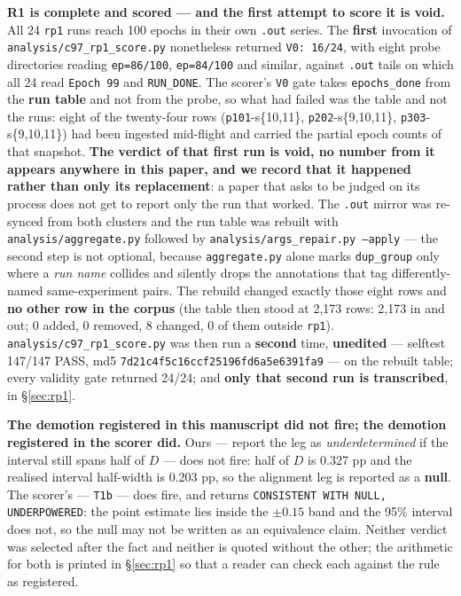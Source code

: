 \documentclass[10pt,letterpaper]{article}
\newcommand{\Dstat}{D}                         %
\newcommand{\arm}[1]{\texttt{#1}}
\begin{document}
\textbf{R1 is complete and scored --- and the first attempt to score it is void.} All 24
\arm{rp1} runs reach 100 epochs in their own \texttt{.out} series. The \textbf{first} invocation
of \texttt{analysis/c97\_rp1\_score.py} nonetheless returned \texttt{V0: 16/24}, with eight probe
directories reading \texttt{ep=86/100}, \texttt{ep=84/100} and similar, against \texttt{.out}
tails on which all 24 read \texttt{Epoch 99} and \texttt{RUN\_DONE}. The scorer's \texttt{V0}
gate takes \texttt{epochs\_done} from the \textbf{run table} and not from the probe, so what had
failed was the table and not the runs: eight of the twenty-four rows
(\arm{p101}-s\{10,11\}, \arm{p202}-s\{9,10,11\}, \arm{p303}-s\{9,10,11\}) had been ingested
mid-flight and carried the partial epoch counts of that snapshot. \textbf{The verdict of that
first run is void, no number from it appears anywhere in this paper, and we record that it
happened rather than only its replacement}: a paper that asks to be judged on its process does
not get to report only the run that worked. The \texttt{.out} mirror was re-synced from both
clusters and the run table was rebuilt with \texttt{analysis/aggregate.py} followed by
\texttt{analysis/args\_repair.py --apply} --- the second step is not optional, because
\texttt{aggregate.py} alone marks \texttt{dup\_group} only where a \emph{run name} collides and
silently drops the annotations that tag differently-named same-experiment pairs. The rebuild
changed exactly those eight rows and \textbf{no other row in the corpus} (the table then stood at
2{,}173 rows: 2{,}173 in and out; 0 added, 0 removed, 8 changed, 0 of them outside \arm{rp1}).
\texttt{analysis/c97\_rp1\_score.py} was then run a \textbf{second} time, \textbf{unedited} ---
selftest 147/147 PASS, md5 \texttt{7d21c4f5c16ccf25196fd6a5e6391fa9} --- on the rebuilt table;
every validity gate returned 24/24; and \textbf{only that second run is transcribed}, in
\S\ref{sec:rp1}.

\textbf{The demotion registered in this manuscript did not fire; the demotion registered in the
scorer did.} Ours --- report the leg as \emph{underdetermined} if the interval still spans half of
$\Dstat$ --- does not fire: half of $\Dstat$ is 0.327 pp and the realised interval half-width is
0.203 pp, so the alignment leg is reported as a \textbf{null}. The scorer's --- \texttt{T1b} ---
does fire, and returns \texttt{CONSISTENT WITH NULL, UNDERPOWERED}: the point estimate lies inside
the $\pm 0.15$ band and the 95\% interval does not, so the null may not be written as an
equivalence claim. Neither verdict was selected after the fact and neither is quoted without the
other; the arithmetic for both is printed in \S\ref{sec:rp1} so that a reader can check each
against the rule as registered.
\end{document}
